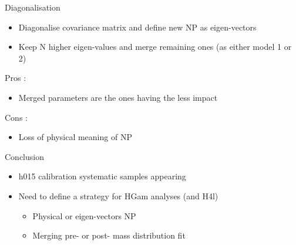 \documentclass[bigger]{beamer}
\begin{document}
\begin{frame}[label={sec:orgb67d4b1}]{Diagonalisation}
\begin{itemize}
\item Diagonalise covariance matrix and define new NP as eigen-vectors
\item Keep N higher eigen-values and merge remaining ones (as either model 1 or 2)
\end{itemize}
\vfill
Pros :
\begin{itemize}
\item Merged parameters are the ones having the less impact
\end{itemize}

Cons :
\begin{itemize}
\item Loss of physical meaning of NP
\end{itemize}
\end{frame}


\begin{frame}[label={sec:org4542a2a}]{Conclusion}
\begin{itemize}
\item h015 calibration systematic samples appearing
\item Need to define a strategy for HGam analyses (and H4l)
\begin{itemize}
\item Physical or eigen-vectors NP
\item Merging pre- or post- mass distribution fit
\end{itemize}
\end{itemize}
\end{frame}
\end{document}
